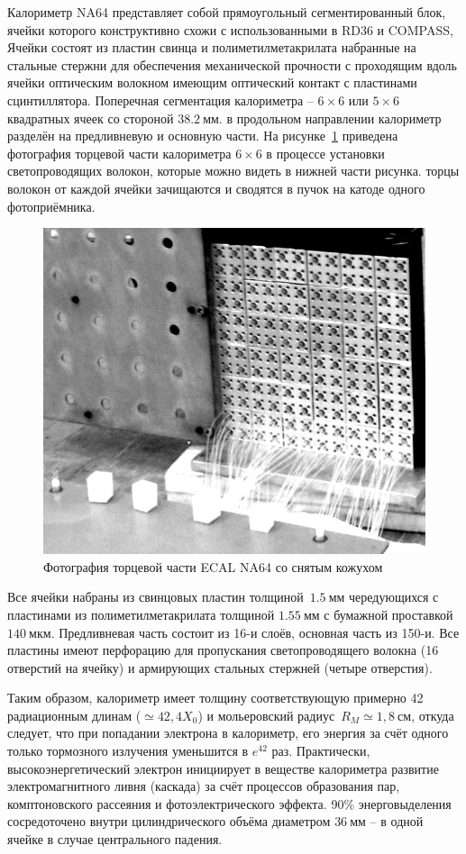 Калориметр NA64 представляет собой прямоугольный сегментированный блок, ячейки
которого конструктивно схожи с использованными в RD36 и COMPASS,
Ячейки состоят из пластин свинца и
полиметилметакрилата набранные на стальные стержни для обеспечения механической
прочности с проходящим вдоль ячейки оптическим волокном имеющим оптический
контакт с пластинами сцинтиллятора.
Поперечная сегментация калориметра -- $6 \times 6$ или $5 \times 6$ квадратных
ячеек со стороной $38.2~\text{мм}$.
в продольном направлении калориметр разделён на предливневую и основную
части. На рисунке~\ref{fig:ecal-assembly-photo-opened} приведена фотография
торцевой части калориметра $6 \times 6$ в процессе установки светопроводящих
волокон, которые можно видеть в нижней части рисунка. торцы волокон от каждой
ячейки зачищаются и сводятся в пучок на катоде одного фотоприёмника.

\begin{figure}
    \centering
    \includegraphics[width=0.5\linewidth]{images/illustrative/ecal-assembly-photo-opened.png}
    \caption{Фотография торцевой части ECAL NA64 со снятым кожухом}
    \label{fig:ecal-assembly-photo-opened}
\end{figure}

Все ячейки набраны из свинцовых пластин толщиной~$1.5~\text{мм}$
чередующихся с пластинами из полиметилметакрилата
толщиной $1.55~\text{мм}$ с бумажной проставкой $140~\text{мкм}$.
Предливневая часть состоит из 16-и слоёв, основная часть из 150-и.
Все пластины имеют перфорацию для пропускания светопроводящего волокна
(16 отверстий на ячейку) и армирующих стальных стержней (четыре отверстия).

Таким образом, калориметр имеет толщину соответствующую примерно 42
радиационным длинам ($\simeq42{,}4 X_0$) и мольеровский
радиус~$R_M\simeq1{,}8~\text{см}$, откуда следует, что при попадании
электрона в калориметр, его энергия
за счёт одного только тормозного излучения уменьшится в $e^{42}$ раз.
Практически, высокоэнергетический электрон инициирует
в веществе калориметра развитие электромагнитного ливня (каскада) за
счёт процессов образования пар, комптоновского рассеяния и
фотоэлектрического эффекта. 90\% энерговыделения сосредоточено
внутри цилиндрического объёма диаметром $36~\text{мм}$ -- в одной
ячейке в случае центрального падения.

